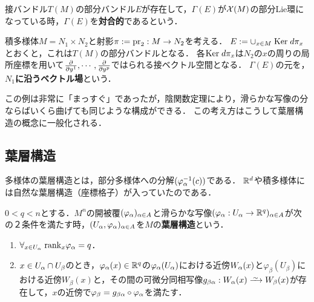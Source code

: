 \documentclass[uplatex,dvipdfmx]{jsreport}
\begin{document}
\begin{definition}[involution]
    接バンドル$T(M)$の部分バンドル$E$が存在して，$\Gamma(E)$が$\mathcal{X}(M)$の部分Lie環になっている時，$\Gamma(E)$を\textbf{対合的}であるという．
\end{definition}

\begin{example}
    積多様体$M=N_1\times N_2$と射影$\pi:=\mathrm{pr}_2:M\to N_2$を考える．
    $E:=\cup_{x\in M}\;\mathrm{Ker}\; d\pi_x$とおくと，これは$T(M)$の部分バンドルとなる．
    各$\mathrm{Ker}\; d\pi_x$は$N_2$の$x$の周りの局所座標を用いて$\frac{\partial }{\partial y^1},\cdots,\frac{\partial }{\partial y^p}$ではられる接ベクトル空間となる．
    $\Gamma(E)$の元を，\textbf{$N_1$に沿うベクトル場}という．

    この例は非常に「まっすぐ」であったが，陰関数定理により，滑らかな写像の分ならばいくら曲げても同じような構成ができる．
    この考え方はこうして葉層構造の概念に一般化される．
\end{example}

\subsection{葉層構造}

\begin{tcolorbox}[colframe=ForestGreen, colback=ForestGreen!10!white,breakable,colbacktitle=ForestGreen!40!white,coltitle=black,fonttitle=\bfseries\sffamily,
title=]
    多様体の葉層構造とは，部分多様体への分解$(\varphi_\alpha^{-1}(c))$である．
    $\mathbb{R}^d$や積多様体には自然な葉層構造（座標格子）が入っていたのである．
\end{tcolorbox}

\begin{definition}[foliation]
    $0<q<n$とする．$M^n$の開被覆$(\varphi_\alpha)_{\alpha\in A}$と滑らかな写像$(\varphi_\alpha:U_\alpha\to\mathbb{R}^q)_{\alpha\in A}$が次の２条件を満たす時，$(U_\alpha,\varphi_\alpha)_{\alpha\in A}$を$M$の\textbf{葉層構造}という．
    \begin{enumerate}
        \item $\forall_{x\in U_\alpha}\;\mathrm{rank}_x\varphi_\alpha=q$．
        \item $x\in U_\alpha\cap U_\beta$のとき，$\varphi_\alpha(x)\in\mathbb{R}^q$の$\varphi_\alpha(U_\alpha)$における近傍$W_\alpha(x)$と$\varphi_\beta(U_\beta)$における近傍$W_\beta(x)$と，その間の可微分同相写像$g_{\beta\al}:W_\al(x)\iso W_\beta(x)$が存在して，$x$の近傍で$\varphi_\beta=g_{\beta\alpha}\circ\varphi_\alpha$を満たす．
    \end{enumerate}
\end{definition}
\end{document}
